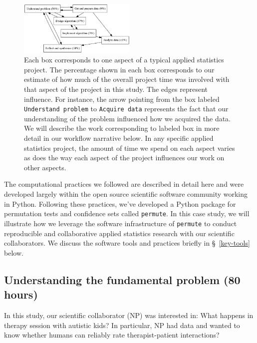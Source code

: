 \documentclass[]{article}
\begin{document}
\begin{figure}[h]
  \centering
    \includegraphics[width=0.5\textwidth]{work_process.png}
  \caption{
  \setlength{\leftskip}{1cm}
  \setlength{\rightskip}{1cm}
  \small
           Each box corresponds to one aspect of a typical applied
           statistics project.
           The percentage shown in each box corresponds to
           our estimate of how much of the overall project time was involved
           with that aspect of the project in this study.
           The edges represent influence.
           For instance,
           the arrow pointing from the box labeled \texttt{Understand problem}
           to \texttt{Acquire data} represents the fact that our understanding
           of the problem influenced how we acquired the data.
           We will describe
           the work corresponding to labeled box in more detail in our
           workflow narrative below.
           In any specific applied statistics project,
           the amount of time we spend on each aspect varies as does the
           way each aspect of the project influences our work on other
           aspects.}\label{fig:work_process}
\end{figure}


The computational practices we followed are described in detail here
\cite{millman2014developing} and were developed largely within the open source
scientific software community working in Python.
Following these practices, we've developed a Python package for permutation
tests and confidence sets called \texttt{permute}.
In this case study, we will illustrate how we leverage the software
infrastructure of \texttt{permute} to conduct reproducible and collaborative
applied statistics research with our scientific collaborators.
We discuss the software tools and practices briefly in \S~\ref{key-tools}
below.

\subsection{Understanding the fundamental problem (80 hours)}

In this study, our scientific collaborator (NP) was interested in:  What
happens in therapy session with autistic kids?
In particular, NP had data and wanted to know whether humans can reliably rate
therapist-patient interactions?
\end{document}
